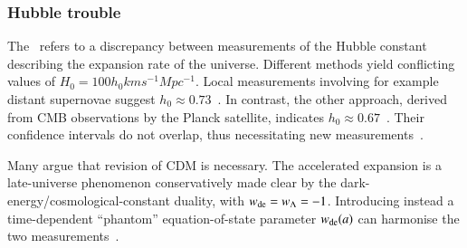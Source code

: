 \subsubsection{Hubble trouble}
    The~ refers to a discrepancy between measurements of the Hubble constant describing the expansion rate of the universe. Different methods yield conflicting values of $H_0 = 100 h_0 \unit{km} \unit{s^{-1}} \unit{Mpc^{-1}}$. Local measurements involving for example distant supernovae suggest $h_0 \approx 0.73$~\citep[e.g.][]{maggioreGravitationalWavesVol2018}. In contrast, the other approach, derived from CMB observations by the Planck satellite, indicates $h_0\approx 0.67$~\citep[e.g.][]{maggioreGravitationalWavesVol2018}. Their confidence intervals do not overlap, thus necessitating new measurements~\citep[e.g.][]{maggioreGravitationalWavesVol2018}. 


    Many argue that revision of \textLambda{}CDM is necessary. The accelerated expansion is a late-universe phenomenon conservatively made clear by the dark-energy/cosmological-constant duality, with $w_\mathrm{de}=w_{\Lambda}=-1$. %
    Introducing instead a time-dependent ``phantom'' equation-of-state parameter $w_\mathrm{de}(a)$ can harmonise the two measurements~\citep{maggioreGravitationalWavesVol2018}. %








